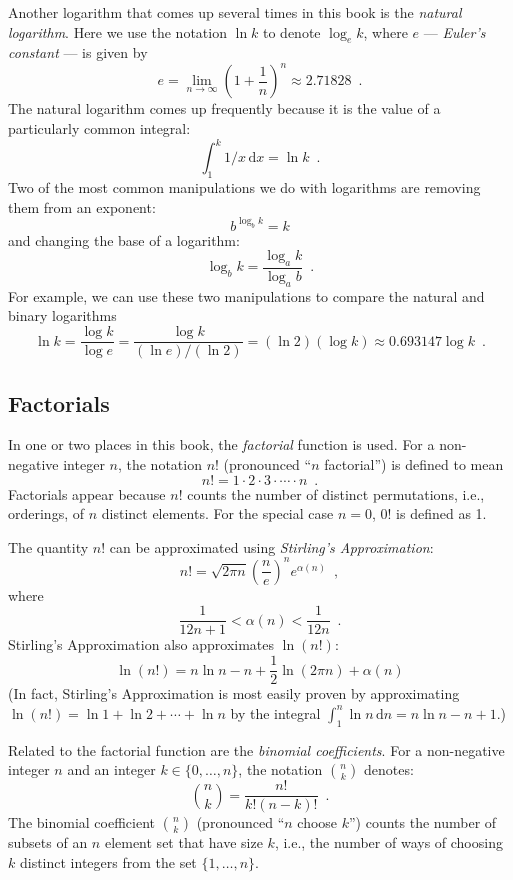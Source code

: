 Another logarithm that comes up several times in this book is the \emph{natural logarithm}.  Here we use the notation $\ln k$ to denote $\log_e k$, where $e$ --- \emph{Euler's constant} --- is given by  
\[
   e = \lim_{n\rightarrow\infty} \left(1+\frac{1}{n}\right)^n
   \approx  2.71828 \enspace .
\]
The natural logarithm comes up frequently because it is the value of a particularly common integral:
\[
    \int_{1}^{k} 1/x\,\mathrm{d}x  = \ln k \enspace .
\]
Two of the most common manipulations we do with logarithms are removing them from an exponent:
\[
    b^{\log_b k} = k
\]
and changing the base of a logarithm:
\[
    \log_b k = \frac{\log_a k}{\log_a b} \enspace .
\]
For example, we can use these two manipulations to compare the natural and binary logarithms
\[
   \ln k = \frac{\log k}{\log e} = \frac{\log k}{(\ln e)/(\ln 2)} = 
    (\ln 2)(\log k) \approx 0.693147\log k \enspace .
\]

\subsection{Factorials}

In one or two places in this book, the \emph{factorial} function is used.  For a non-negative integer $n$, the notation $n!$ (pronounced ``$n$ factorial'') is defined to mean 
\[
   n! = 1\cdot2\cdot3\cdot\cdots\cdot n \enspace .
\]
Factorials appear because $n!$ counts the number of distinct permutations, i.e., orderings, of $n$ distinct elements.   For the special case $n=0$, $0!$ is defined as 1. 

 The quantity $n!$ can be approximated using \emph{Stirling's Approximation}:
\[
	n! 
   = \sqrt{2\pi n}\left(\frac{n}{e}\right)^{n}e^{\alpha(n)} \enspace ,
\]
where
\[  
   \frac{1}{12n+1} <  \alpha(n) < \frac{1}{12n}  \enspace .
\]
Stirling's Approximation also approximates $\ln(n!)$:
\[
   \ln(n!) = n\ln n - n + \frac{1}{2}\ln(2\pi n) + \alpha(n)
\]
(In fact, Stirling's Approximation is most easily proven by approximating
$\ln(n!)=\ln 1 + \ln 2  + \cdots + \ln n$ by the integral
$\int_1^n \ln n\,\mathrm{d}n = n\ln n - n +1$.)

Related to the factorial function are the \emph{binomial coefficients}.  For a non-negative integer $n$ and an integer $k\in\{0,\ldots,n\}$, the notation $\binom{n}{k}$ denotes:
\[
   \binom{n}{k} = \frac{n!}{k!(n-k)!} \enspace .
\]
The binomial coefficient $\binom{n}{k}$ (pronounced ``$n$ choose $k$'') counts the number of subsets of an $n$ element set that have size $k$, i.e., the number of ways of choosing $k$ distinct integers from the set $\{1,\ldots,n\}$.


